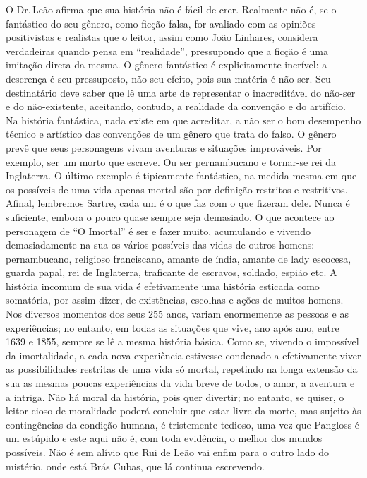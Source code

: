O Dr.\,Leão afirma que sua história não é fácil de crer. Realmente não é,
se o fantástico do seu gênero, como ficção falsa, for avaliado com as
opiniões positivistas e realistas que o leitor, assim como João
Linhares, considera verdadeiras quando pensa em ``realidade'', pressupondo
que a ficção é uma imitação direta da mesma. O gênero fantástico é
explicitamente incrível: a descrença é seu pressuposto, não seu efeito,
pois sua matéria é não-ser. Seu destinatário deve saber que lê uma arte
de representar o inacreditável do não-ser e do não-existente, aceitando,
contudo, a realidade da convenção e do artifício. Na história
fantástica, nada existe em que acreditar, a não ser o bom desempenho
técnico e artístico das convenções de um gênero que trata do falso. O
gênero prevê que seus personagens vivam aventuras e situações
improváveis. Por exemplo, ser um morto que escreve. Ou ser pernambucano
e tornar-se rei da Inglaterra. O último exemplo é tipicamente
fantástico, na medida mesma em que os possíveis de uma vida apenas
mortal são por definição restritos e restritivos. Afinal, lembremos
Sartre, cada um é o que faz com o que fizeram dele. Nunca é suficiente,
embora o pouco quase sempre seja demasiado. O que acontece ao personagem
de ``O Imortal'' é ser e fazer muito, acumulando e vivendo demasiadamente
na sua os vários possíveis das vidas de outros homens: pernambucano,
religioso franciscano, amante de índia, amante de lady escocesa, guarda
papal, rei de Inglaterra, traficante de escravos, soldado, espião etc. A
história incomum de sua vida é efetivamente uma história esticada como
somatória, por assim dizer, de existências, escolhas e ações de muitos
homens. Nos diversos momentos dos seus 255 anos, variam enormemente as
pessoas e as experiências; no entanto, em todas as situações que vive,
ano após ano, entre 1639 e 1855, sempre se lê a mesma história básica.
Como se, vivendo o impossível da imortalidade, a cada nova experiência
estivesse condenado a efetivamente viver as possibilidades restritas de
uma vida só mortal, repetindo na longa extensão da sua as mesmas poucas
experiências da vida breve de todos, o amor, a aventura e a intriga. Não
há moral da história, pois quer divertir; no entanto, se quiser, o
leitor cioso de moralidade poderá concluir que estar livre da morte, mas
sujeito às contingências da condição humana, é tristemente tedioso, uma
vez que Pangloss é um estúpido e este aqui não é, com toda evidência, o
melhor dos mundos possíveis. Não é sem alívio que Rui de Leão vai enfim
para o outro lado do mistério, onde está Brás Cubas, que lá continua
escrevendo.

